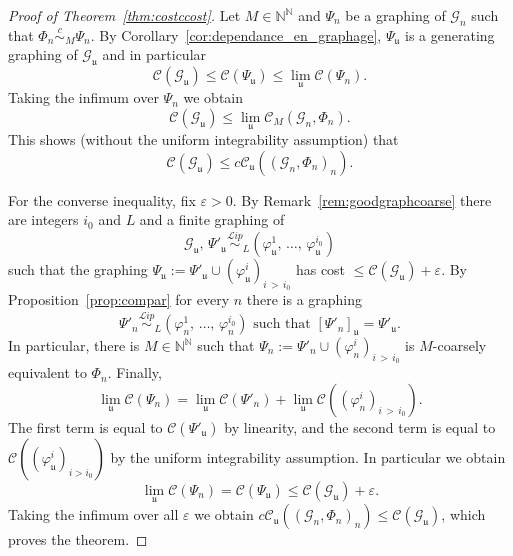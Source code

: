 \documentclass[AHL,Unicode,longabstracts,published]{cedram}
\newcommand{\Nmath}{\mathbb{N}}
\newcommand{\cost}{\mathcal{C}}
\newcommand{\ccost}{c\mathcal{C}}
\newcommand{\cg}{\mathcal{G}}
\newcommand{\ul}{\mathfrak{u}}
\newcommand{\eps}{\varepsilon}
\newcommand{\ph}{\varphi}
\newcommand\Lipeq{\overset{\mathcal{L}ip}{\sim}}
\newcommand\ceq{\overset{c}{\sim}}
\begin{document}
\begin{proof}[Proof of Theorem~\ref{thm:costccost}] Let $M \in \Nmath^\Nmath$ and $\Psi_n$ be a graphing of $\cg_n$ such that $\Phi_n \ceq_M \Psi_n$. By Corollary~\ref{cor:dependance_en_graphage}, $\Psi_\ul$ is a generating graphing of $\cg_\ul$ and in particular
\[
\cost(\cg_\ul) \leq \cost(\Psi_\ul) \leq \lim_\ul \cost(\Psi_n).
\]
Taking the infimum over $\Psi_n$ we obtain
\[
\cost(\cg_\ul) \leq \lim_\ul \cost_M(\cg_n,\Phi_n).
\]
This shows (without the uniform integrability assumption) that
\[
\cost(\cg_\ul) \leq \ccost_\ul((\cg_n,\Phi_n)_n).
\]

For the converse inequality, fix $\eps>0$. By Remark~\ref{rem:goodgraphcoarse} there are integers $i_0$ and $L$ and a finite graphing of
\[
\cg_\ul,\,\Psi'_\ul \Lipeq_L \left(\ph_\ul^1,\,\dots,\,\ph_\ul^{i_0}\right)
\]
such that the graphing $\Psi_\ul :=\Psi'_\ul \cup (\ph_\ul^i)_{i\,>\,i_0}$ has cost $\leq \cost(\cg_\ul)+\varepsilon$. By Proposition~\ref{prop:compar} for every $n$ there is a graphing
\[
\Psi'_n\Lipeq_L \left(\ph_n^1,\,\dots,\,\ph_n^{i_0}\right)\text{ such that }\left[\Psi'_n\right]_\ul =\Psi'_\ul.
\]
In particular, there is $M \in \Nmath^\Nmath$ such that $\Psi_n := \Psi'_n \cup (\ph_n^i)_{i\,>\,i_0}$ is $M$-coarsely equivalent to $\Phi_n$. Finally,
\[
\lim_\ul \cost(\Psi_n) = \lim_\ul \cost(\Psi'_n) + \lim_\ul \cost\left(\left(\ph_n^i\right)_{i\,>\,i_0}\right).
\]
The first term is equal to $\cost(\Psi'_\ul)$ by linearity, and the second term is equal to $\cost((\ph_\ul^i)_{i>i_0})$ by the uniform integrability assumption. In particular we obtain
\[
\lim_\ul \cost(\Psi_n) = \cost(\Psi_\ul) \leq \cost(\cg_\ul)+\eps.
\]
Taking the infimum over all $\eps$ we obtain $\ccost_\ul((\cg_n,\Phi_n)_n) \leq \cost(\cg_\ul)$, which proves the theorem.
\end{proof}
\end{document}
